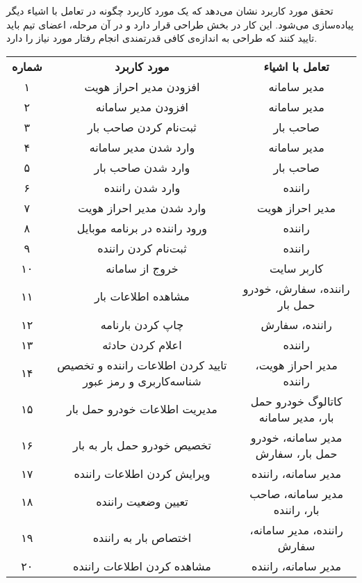 
تحقق مورد کاربرد  نشان می‌دهد که یک مورد کاربرد چگونه در تعامل با اشیاء دیگر پیاده‌سازی می‌شود. این کار در بخش طراحی قرار دارد و در آن مرحله، اعضای تیم باید تایید کنند که طراحی به اندازه‌ی کافی قدرتمندی انجام رفتار مورد نیاز را دارد.

\begin{table}[!hbtp]
	\centering
	\begin{tabular}{|c|c|c|}
		\cline{1-3}
		\textbf{شماره} & \textbf{مورد کاربرد} & \textbf{تعامل با اشیاء} \\ \cline{1-3}
	۱ & افزودن مدیر احراز هویت & مدیر سامانه \\
	۲ & افزودن مدیر سامانه & مدیر سامانه \\ 
	۳ & ثبت‌نام کردن صاحب بار & صاحب بار \\
	۴ & وارد شدن مدیر سامانه & مدیر سامانه \\
	۵ & وارد شدن صاحب بار & صاحب بار \\
	۶ & وارد شدن راننده & راننده \\
	۷ & وارد شدن مدیر احراز هویت & مدیر احراز هویت \\
	۸ & ورود راننده در برنامه موبایل & راننده \\
	۹ & ثبت‌نام کردن راننده & راننده \\
	۱۰ & خروج از سامانه & کاربر سایت \\
	۱۱ & مشاهده اطلاعات بار & راننده، سفارش، خودرو حمل بار \\
	۱۲ & چاپ کردن بارنامه & راننده، سفارش \\
	۱۳ & اعلام کردن حادثه & راننده \\
	۱۴ & تایید کردن اطلاعات راننده و تخصیص شناسه‌کاربری و رمز عبور & مدیر احراز هویت، راننده \\ 
	۱۵ & مدیریت اطلاعات خودرو حمل بار & کاتالوگ خودرو حمل بار،‌ مدیر سامانه \\
	۱۶ & تخصیص خودرو حمل بار به بار & مدیر سامانه، خودرو حمل بار، سفارش \\
	۱۷ & ویرایش کردن اطلاعات راننده & مدیر سامانه، راننده \\
	۱۸ & تعیین وضعیت راننده & مدیر سامانه، صاحب بار، راننده \\
	۱۹ & اختصاص بار به راننده & راننده، مدیر سامانه، سفارش \\
	۲۰ & مشاهده کردن اطلاعات راننده & مدیر سامانه، راننده \\
	\cline{1-3}
	\end{tabular}
\end{table}

